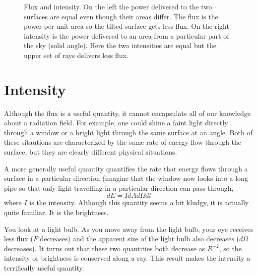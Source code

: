 \begin{figure}
\caption{Flux and intensity.  On the left the power delivered to the
  two surfaces are equal even though their areas differ.  The flux is
  the power per unit area so the tilted surface gets less flux.  On
  the right intensity is the power delivered to an area from a
  particular part of the sky (solid angle).  Here the two intensities
  are equal but the upper set of rays delivers less flux.}
\end{figure}
\section{Intensity}
\label{sec:intensity}

Although the flux is a useful quantity, it cannot encapsulate all of
our knowledge about a radiation field.  For example, one could shine a
faint light directly through a window or a bright light through the
same surface at an angle.  Both of these sitautions are characterized
by the same rate of energy flow through the surface, but they are
clearly different physical situations.

A more generally useful quantity quantifies the rate that energy flows
through a surface in a particular direction (imagine that the window
now looks into a long pipe so that only light travelling in a
particular direction can pass through,
\begin{equation}
dE = I d\!A d \Omega dt 
\label{eq:4}
\end{equation}
where $I$ is the intensity. Although this quantity seems a bit kludgy,
it is actually quite familiar.  It is the brightness.

You look at a light bulb.   As you move away from the light bulb, your
eye receives less flux ($F$ decreases) and the apparent size of the
light bulb also decreases ($d\Omega$ decreases).  It turns out that
these two quantities both decrease as $R^{-2}$, so the intensity or
brightness is conserved along a ray.  This result makes the intensity
a terrifically useful quantity.


